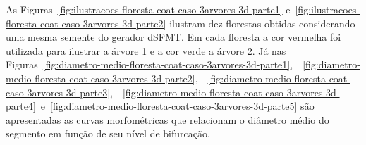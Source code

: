 As Figuras~\ref{fig:ilustracoes-floresta-coat-caso-3arvores-3d-parte1} 
e~\ref{fig:ilustracoes-floresta-coat-caso-3arvores-3d-parte2} ilustram 
dez florestas obtidas considerando uma mesma semente do gerador dSFMT. Em cada floresta a cor vermelha foi utilizada 
para ilustrar a árvore 1 e a cor verde a árvore 2.
Já nas Figuras~\ref{fig:diametro-medio-floresta-coat-caso-3arvores-3d-parte1},\ 
~\ref{fig:diametro-medio-floresta-coat-caso-3arvores-3d-parte2},\ 
~\ref{fig:diametro-medio-floresta-coat-caso-3arvores-3d-parte3},\ 
~\ref{fig:diametro-medio-floresta-coat-caso-3arvores-3d-parte4}\ 
e~\ref{fig:diametro-medio-floresta-coat-caso-3arvores-3d-parte5} são apresentadas 
as curvas morfométricas que relacionam o diâmetro médio 
do segmento em função de seu nível de bifurcação.

\clearpage

